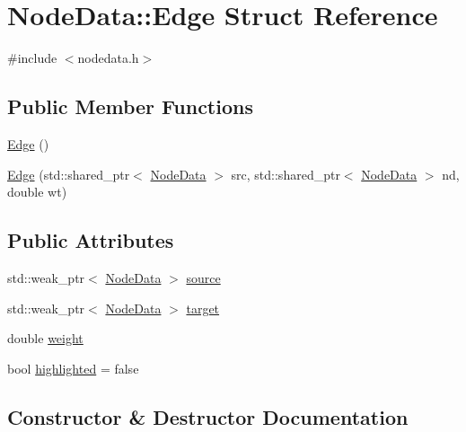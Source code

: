 \hypertarget{struct_node_data_1_1_edge}{}\section{Node\+Data\+::Edge Struct Reference}
\label{struct_node_data_1_1_edge}


{\ttfamily \#include $<$nodedata.\+h$>$}

\subsection*{Public Member Functions}
\begin{DoxyCompactItemize}
\item 
\mbox{\hyperlink{struct_node_data_1_1_edge_a399ac8b2455649338826fa5102eaa985}{Edge}} ()
\item 
\mbox{\hyperlink{struct_node_data_1_1_edge_a16e86dc9332ab41c3fbb0944448953cc}{Edge}} (std\+::shared\+\_\+ptr$<$ \mbox{\hyperlink{class_node_data}{Node\+Data}} $>$ src, std\+::shared\+\_\+ptr$<$ \mbox{\hyperlink{class_node_data}{Node\+Data}} $>$ nd, double wt)
\end{DoxyCompactItemize}
\subsection*{Public Attributes}
\begin{DoxyCompactItemize}
\item 
std\+::weak\+\_\+ptr$<$ \mbox{\hyperlink{class_node_data}{Node\+Data}} $>$ \mbox{\hyperlink{struct_node_data_1_1_edge_afc79148f76a832e39aaf77ba3055aae8}{source}}
\item 
std\+::weak\+\_\+ptr$<$ \mbox{\hyperlink{class_node_data}{Node\+Data}} $>$ \mbox{\hyperlink{struct_node_data_1_1_edge_aab7b2994ead391b9f2ccfac5decfeb1c}{target}}
\item 
double \mbox{\hyperlink{struct_node_data_1_1_edge_a83f11bbc9d390a4bafc7acb2dc7186f0}{weight}}
\item 
bool \mbox{\hyperlink{struct_node_data_1_1_edge_a0c92519f4f3db36e2132257f9cc54fc0}{highlighted}} = false
\end{DoxyCompactItemize}


\subsection{Constructor \& Destructor Documentation}
\mbox{\label{struct_node_data_1_1_edge_a399ac8b2455649338826fa5102eaa985}} 

